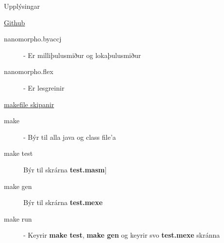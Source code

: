 \documentclass{homework}
\begin{document}

\begin{question}{Upplýsingar}
\end{question}
\begin{answer}
  \href{https://github.com/slowpokesheep/thydendur/tree/master/nanomorpho_byacc}{Github}
  \begin{description}
    \item[nanomorpho.byaccj] - Er milliþulusmiður og lokaþulusmiður
    \item[nanomorpho.flex] - Er lesgreinir
  \end{description}
  \underline{makefile skipanir}
  \begin{description}
    \item[make] - Býr til alla java og class file'a
    \item[make test] Býr til skrárna \textbf{test.masm}] 
    \item[make gen] Býr til skrárna \textbf{test.mexe}
    \item[make run] - Keyrir \textbf{make test}, \textbf{make gen} og keyrir svo \textbf{test.mexe} skránna
  \end{description}
\end{answer}
\end{document}
